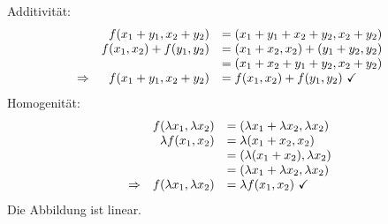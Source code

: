 \documentclass[main.tex]{subfiles}
\begin{document}
Additivität:
\begin{equation*}
    \begin{array}{ r r l }
    & f( x_{1} +y_{1} ,x_{2} +y_{2}) & =( x_{1} +y_{1} +x_{2} +y_{2} ,x_{2} +y_{2})\\
    & f( x_{1} ,x_{2}) +f( y_{1} ,y_{2}) & =( x_{1} +x_{2} ,x_{2}) +( y_{1} +y_{2} ,y_{2})\\
    &  & =( x_{1} +x_{2} +y_{1} +y_{2} ,x_{2} +y_{2})\\
    \Rightarrow  & f( x_{1} +y_{1} ,x_{2} +y_{2}) & =f( x_{1} ,x_{2}) +f( y_{1} ,y_{2}) \ \checkmark
    \end{array}
\end{equation*}
Homogenität:
\begin{equation*}
    \begin{array}{ r r l }
    & f( \lambda x_{1} ,\lambda x_{2}) & =( \lambda x_{1} +\lambda x_{2} ,\lambda x_{2})\\
    & \lambda f( x_{1} ,x_{2}) & =\lambda ( x_{1} +x_{2} ,x_{2})\\
    &  & =( \lambda ( x_{1} +x_{2}) ,\lambda x_{2})\\
    &  & =( \lambda x_{1} +\lambda x_{2} ,\lambda x_{2})\\
    \Rightarrow  & f( \lambda x_{1} ,\lambda x_{2}) & =\lambda f( x_{1} ,x_{2}) \ \checkmark
    \end{array}
\end{equation*}
Die Abbildung ist linear.
\end{document}
